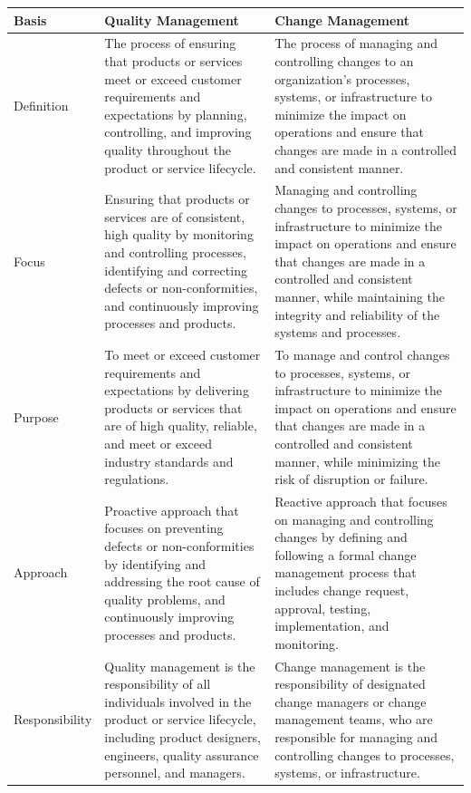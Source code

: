 \documentclass[12pt]{article}
\begin{document}
\begin{enumerate}
\begin{enumerate}
\begin{longtable}{|C{3cm}|L{4.5cm}|L{4.5cm}|}
            \hline
            \textbf{Basis} & \textbf{Quality Management} & \textbf{Change Management} \\
            \hline
            Definition & The process of ensuring that products or services meet or exceed customer requirements and expectations by planning, controlling, and improving quality throughout the product or service lifecycle. & The process of managing and controlling changes to an organization's processes, systems, or infrastructure to minimize the impact on operations and ensure that changes are made in a controlled and consistent manner. \\
            \hline
            Focus & Ensuring that products or services are of consistent, high quality by monitoring and controlling processes, identifying and correcting defects or non-conformities, and continuously improving processes and products. & Managing and controlling changes to processes, systems, or infrastructure to minimize the impact on operations and ensure that changes are made in a controlled and consistent manner, while maintaining the integrity and reliability of the systems and processes. \\
            \hline
            Purpose & To meet or exceed customer requirements and expectations by delivering products or services that are of high quality, reliable, and meet or exceed industry standards and regulations. & To manage and control changes to processes, systems, or infrastructure to minimize the impact on operations and ensure that changes are made in a controlled and consistent manner, while minimizing the risk of disruption or failure. \\
            \hline
            Approach & Proactive approach that focuses on preventing defects or non-conformities by identifying and addressing the root cause of quality problems, and continuously improving processes and products. & Reactive approach that focuses on managing and controlling changes by defining and following a formal change management process that includes change request, approval, testing, implementation, and monitoring. \\
            \hline
            Responsibility & Quality management is the responsibility of all individuals involved in the product or service lifecycle, including product designers, engineers, quality assurance personnel, and managers. & Change management is the responsibility of designated change managers or change management teams, who are responsible for managing and controlling changes to processes, systems, or infrastructure. \\

\end{longtable}
\end{enumerate}
\end{enumerate}
\end{document}
